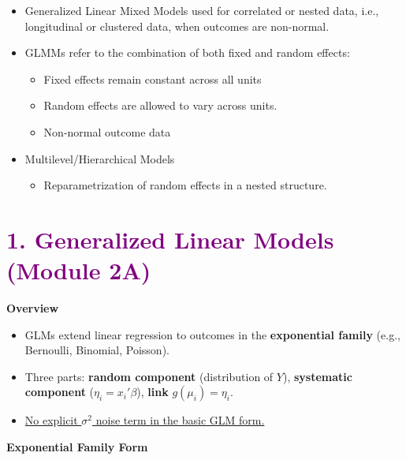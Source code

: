 \documentclass[
  letterpaper,
  DIV=11,
  numbers=noendperiod]{scrreprt}
\providecommand{\tightlist}{%
  \setlength{\itemsep}{0pt}\setlength{\parskip}{0pt}}\usepackage{longtable,booktabs,array}
\begin{document}
\markright{\textcolor{purple}{Overview}}

\begin{itemize}
\tightlist
\item
  Generalized Linear Mixed Models used for correlated or nested data,
  i.e., longitudinal or clustered data, when outcomes are non-normal.
\item
  GLMMs refer to the combination of both fixed and random effects:

  \begin{itemize}
  \tightlist
  \item
    Fixed effects remain constant across all units
  \item
    Random effects are allowed to vary across units.
  \item
    Non-normal outcome data
  \end{itemize}
\item
  Multilevel/Hierarchical Models

  \begin{itemize}
  \tightlist
  \item
    Reparametrization of random effects in a nested structure.
  \end{itemize}
\end{itemize}

\hypertarget{section-12}{%
\section*{\texorpdfstring{\textcolor{purple}{1. Generalized Linear Models (Module 2A)}}{}}\label{section-12}}

\markright{\textcolor{purple}{1. Generalized Linear Models (Module 2A)}}

\textbf{Overview}

\begin{itemize}
\tightlist
\item
  GLMs extend linear regression to outcomes in the \textbf{exponential
  family} (e.g., Bernoulli, Binomial, Poisson).
\item
  Three parts: \textbf{random component} (distribution of \(Y\)),
  \textbf{systematic component} (\(\eta_i = x_i' \beta\)), \textbf{link}
  \(g(\mu_i)=\eta_i\).
\item
  \ul{No explicit \(\sigma^2\) noise term in the basic GLM form.}
\end{itemize}

\textbf{Exponential Family Form}
\end{document}
